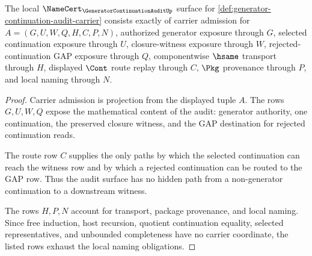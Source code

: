 \begin{theorem}
\label{thm:generator-continuation-audit-namecert-obligations}
The local $\NameCert_{\GeneratorContinuationAuditUp}$ surface for \autoref{def:generator-continuation-audit-carrier} consists exactly of carrier admission for $A=(G,U,W,Q,H,C,P,N)$, authorized generator exposure through $G$, selected continuation exposure through $U$, closure-witness exposure through $W$, rejected-continuation GAP exposure through $Q$, componentwise $\hsame$ transport through $H$, displayed $\Cont$ route replay through $C$, $\Pkg$ provenance through $P$, and local naming through $N$.
\end{theorem}
\begin{proof}
Carrier admission is projection from the displayed tuple $A$. The rows $G,U,W,Q$ expose the mathematical content of the audit: generator authority, one continuation, the preserved closure witness, and the GAP destination for rejected continuation reads.

The route row $C$ supplies the only paths by which the selected continuation can reach the witness row and by which a rejected continuation can be routed to the GAP row. Thus the audit surface has no hidden path from a non-generator continuation to a downstream witness.

The rows $H,P,N$ account for transport, package provenance, and local naming. Since free induction, host recursion, quotient continuation equality, selected representatives, and unbounded completeness have no carrier coordinate, the listed rows exhaust the local naming obligations.
\end{proof}

